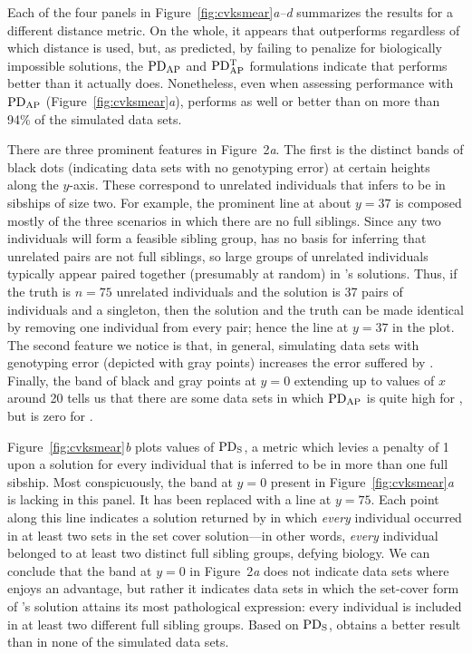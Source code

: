 Each of the four panels in Figure~\ref{fig:cvksmear}{\em a--d} summarizes the results for a different 
distance metric.  On the whole, it appears that \colony{} outperforms \kinalyzer{} regardless of which 
distance is used, but, as predicted, by failing to penalize for biologically impossible solutions, the 
$\mathrm{PD_{AP}}$ and $\mathrm{PD_{AP}^T}$ formulations indicate that \kinalyzer{} performs better than it actually does.   
Nonetheless, even when assessing performance with $\mathrm{PD_{AP}}$ (Figure~\ref{fig:cvksmear}{\em a}), \colony{} 
performs as well or better than \kinalyzer{} on more than 94\% of the simulated data sets. 

There are three prominent features in Figure~2{\em a}.  The first is the distinct bands of black dots 
(indicating data sets with no genotyping error) at certain heights along the $y$-axis.  These 
correspond to unrelated individuals that \kinalyzer{} infers to be in sibships of size two.  For 
example, the prominent line at about $y=37$ is composed mostly of the three scenarios in which there 
are no full siblings. Since any two individuals will form a feasible sibling group, \kinalyzer{} has no 
basis for inferring that unrelated pairs are not full siblings, so large groups of unrelated 
individuals typically appear paired together (presumably at random) in \kinalyzer{}'s solutions.  Thus, 
if the truth is $n=75$ unrelated individuals and the \kinalyzer{} solution is 37 pairs of individuals 
and a singleton, then the \kinalyzer{} solution and the truth can be made identical by removing one 
individual from every pair; hence the line at $y=37$ in the plot. The second feature we notice is that, 
in general, simulating data sets with genotyping error (depicted with gray points) increases the error 
suffered by \kinalyzer{}.  Finally, the band of black and gray points at $y=0$ extending up to values 
of $x$ around 20 tells us that there are some data sets in which $\mathrm{PD_{AP}}$ is quite high for 
\colony{}, but is zero for \kinalyzer{}.  

Figure~\ref{fig:cvksmear}{\em b} plots values of $\mathrm{PD_S}$, a metric which levies a penalty of 1 upon a 
solution for every individual that is inferred to be in more than one full sibship.  Most 
conspicuously, the band at $y=0$ present in Figure~\ref{fig:cvksmear}{\em a} is lacking in this panel.  
It has been replaced with a line at $y=75$.  Each point along this line indicates a solution returned 
by \kinalyzer{} in which {\em every} individual occurred in at least two sets in the set cover 
solution---in other words, {\em every} individual belonged to at least two distinct full sibling 
groups, defying biology.  We can conclude that the band at $y=0$ in Figure~2{\em a} does not indicate 
data sets where \kinalyzer{} enjoys an advantage, but rather it indicates data sets in which the
set-cover form of \kinalyzer{}'s solution attains its most pathological expression: every individual is 
included in at least two different full sibling groups.  Based on $\mathrm{PD_S}$, \kinalyzer{} obtains a better 
result than \colony{} in none of the simulated data sets.

